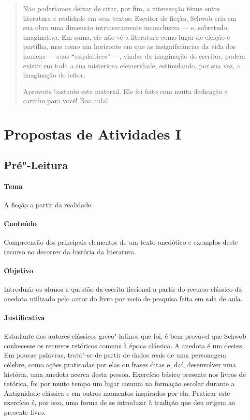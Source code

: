 \documentclass[12pt]{extarticle}
\begin{document}
\begin{abstract}
Não poderíamos deixar de citar, por fim, a intersecção tênue entre literatura 
e realidade em seus textos. Escritor de ficção, Schwob cria em sua obra uma 
dimensão intrinsecamente inconclusiva --- e, sobretudo, imaginativa. Em suma, 
ele não vê a literatura como lugar de eleição e partilha, mas como um horizonte 
em que as insignificâncias da vida dos homens --- suas ``esquisitices'' ---, vindas 
da imaginação do escritor, podem existir em toda a sua misteriosa efemeridade, 
estimulando, por sua vez, a imaginação do leitor.

Aproveite bastante este material. Ele foi feito com muita dedicação e
carinho para você! Boa aula!

\end{abstract}

\tableofcontents


\section{Propostas de Atividades I}

\subsection{Pré"-Leitura}

 \paragraph{Tema} A ficção a partir da realidade

 \paragraph{Conteúdo} Compreensão dos principais elementos de um texto
 anedótico e exemplos deste recurso no decorrer da história da literatura.

 \paragraph{Objetivo} Introduzir os alunos à questão da escrita ficcional a partir
 do recurso clássico da anedota utilizado pelo autor do livro por meio de pesquisa
 feita em sala de aula.

 \paragraph{Justificativa} Estudante dos autores clássicos greco"-latinos que foi,
 é bem provável que Schwob conhecesse os recursos retóricos comuns à época clássica.
 A anedota é um destes. Em poucas palavras, trata"-se de partir de dados reais de 
 uma personagem célebre, como ações praticadas por elas ou frases ditas e, daí, 
 desenvolver uma história, uma anedota acerca desta pessoa. Exercício básico
 presente nos livros de retórica, foi por muito tempo um lugar comum 
 na formação escolar durante a Antiguidade clássica e em outros momentos inspirados por ela. 
 Praticar este exercício é, por isso, uma forma de se introduzir à tradição que deu origem ao
 presente livro.
\end{document}
